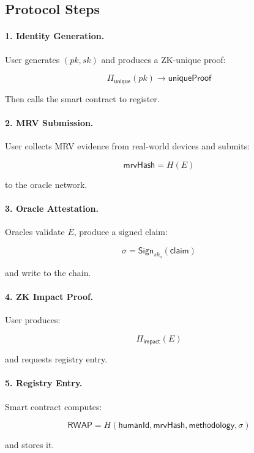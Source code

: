\documentclass[11pt,a4paper]{report}
\theoremstyle{definition}
\theoremstyle{remark}
\begin{document}
\subsection*{Protocol Steps}

\paragraph{1. Identity Generation.}

User generates $(pk, sk)$ and produces a ZK-unique proof:

\[
  \Pi_{\textsf{unique}}(pk) \rightarrow \mathsf{uniqueProof}
\]

Then calls the smart contract to register.

\paragraph{2. MRV Submission.}

User collects MRV evidence from real-world devices and submits:

\[
  \mathsf{mrvHash} = H(E)
\]

to the oracle network.

\paragraph{3. Oracle Attestation.}

Oracles validate $E$, produce a signed claim:

\[
  \sigma = \mathsf{Sign}_{sk_o}(\mathsf{claim})
\]

and write to the chain.

\paragraph{4. ZK Impact Proof.}

User produces:

\[
  \Pi_{\textsf{impact}}(E)
\]

and requests registry entry.

\paragraph{5. Registry Entry.}

Smart contract computes:

\[
  \mathsf{RWAP} = H(\mathsf{humanId}, \mathsf{mrvHash}, \mathsf{methodology}, \sigma)
\]

and stores it.
\end{document}
